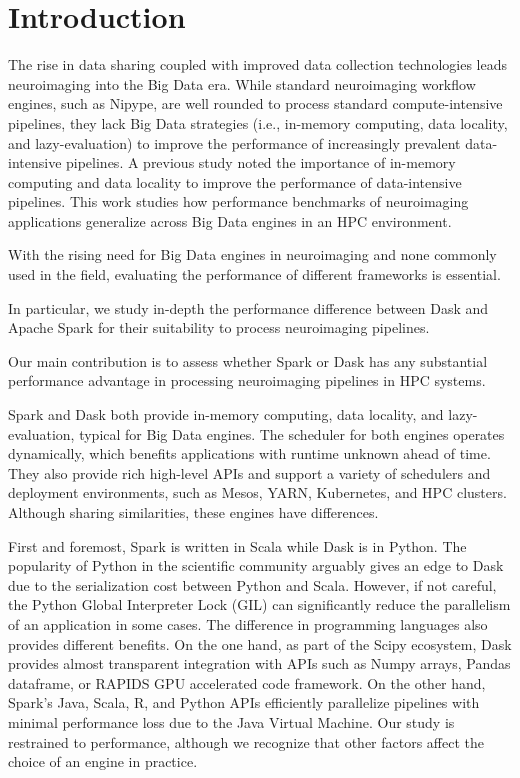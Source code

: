 \documentclass[AMA,STIX1COL]{WileyNJD-v2}
\newcommand{\HL}[1]{#1}
\begin{document}
\section{Introduction}
The rise in data sharing coupled with improved data collection technologies leads neuroimaging into the Big Data era\cite{ALFAROALMAGRO2018400, van2014human, ConpPortal}.
While standard neuroimaging workflow engines, such as Nipype\cite{Nipype:11}, are well rounded to process standard compute-intensive pipelines,
they lack Big Data strategies (i.e., in-memory computing, data locality, and lazy-evaluation) to improve the performance of increasingly prevalent data-intensive pipelines.
A previous study\cite{8752675} noted the importance of in-memory computing and data locality to improve the performance of data-intensive pipelines.
This work studies how performance benchmarks \HL{of neuroimaging applications} generalize across Big Data engines in an HPC environment.
\HL{
	With the rising need for Big Data engines in neuroimaging and none commonly
	used in the field, evaluating the performance of different frameworks is essential.
}
In particular, we study in-depth the performance difference between Dask\cite{Dask:15} and Apache Spark\cite{Spark:16} for their suitability to process neuroimaging pipelines.
\HL{
	Our main contribution is to assess whether Spark or Dask has any substantial performance advantage in processing neuroimaging pipelines in HPC systems.
}
	
Spark and Dask both provide in-memory computing, data locality, and lazy-evaluation, typical for Big Data engines.
The scheduler for both engines operates dynamically, which benefits applications with runtime unknown ahead of time\cite{Dask:15}.
They also provide rich high-level APIs and support a variety of schedulers and deployment environments, such as Mesos\cite{hindman2011mesos}, YARN\cite{vavilapalli2013apache}, Kubernetes, and HPC clusters.
Although sharing similarities, these engines have differences.
	
First and foremost, Spark is written in Scala while Dask is in Python.
The popularity of Python in the scientific community arguably gives an edge to Dask due to the serialization cost between Python and Scala.
However, if not careful, the Python Global Interpreter Lock (GIL) can significantly reduce the parallelism of an application in some cases.
The difference in programming languages also provides different benefits.
On the one hand, as part of the Scipy ecosystem, Dask provides almost transparent integration with APIs such as Numpy arrays, Pandas dataframe, or RAPIDS GPU accelerated code framework.
On the other hand, Spark's Java, Scala, R, and Python APIs efficiently parallelize pipelines with minimal performance loss due to the Java Virtual Machine.
Our study is restrained to performance, although we recognize that other factors affect the choice of an engine in practice.
	
\end{document}
